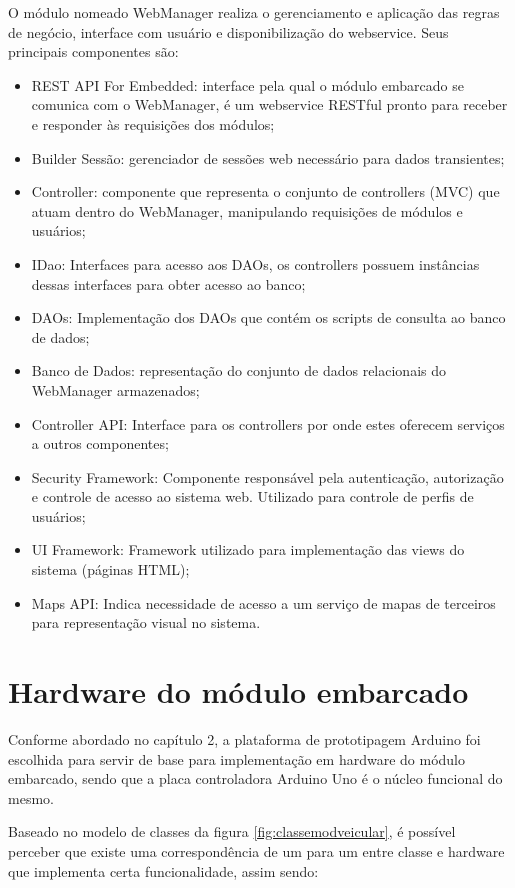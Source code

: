 O módulo nomeado WebManager realiza o gerenciamento e aplicação das regras de negócio, interface com usuário e disponibilização do webservice. Seus principais componentes são:

\begin{itemize}
	\item REST API For Embedded: interface pela qual o módulo embarcado se comunica com o WebManager, é um webservice RESTful pronto para receber e responder às requisições dos módulos;
	\item Builder Sessão: gerenciador de sessões web necessário para dados transientes;
	\item Controller: componente que representa o conjunto de controllers (MVC) que atuam dentro do WebManager, manipulando requisições de módulos e usuários;
	\item IDao: Interfaces para acesso aos DAOs, os controllers possuem instâncias dessas interfaces para obter acesso ao banco;
	\item DAOs: Implementação dos DAOs que contém os scripts de consulta ao banco de dados;
	\item Banco de Dados: representação do conjunto de dados relacionais do WebManager armazenados;
	\item Controller API: Interface para os controllers por onde estes oferecem serviços a outros componentes;
	\item Security Framework: Componente responsável pela autenticação, autorização e controle de acesso ao sistema web. Utilizado para controle de perfis de usuários;
	\item UI Framework: Framework utilizado para implementação das views do sistema (páginas HTML);
	\item Maps API: Indica necessidade de acesso a um serviço de mapas de terceiros para representação visual no sistema.
\end{itemize}

\section{Hardware do módulo embarcado}

Conforme abordado no capítulo 2, a plataforma de prototipagem Arduino foi escolhida para servir de base para implementação em hardware do módulo embarcado, sendo que a placa controladora Arduino Uno é o núcleo funcional do mesmo. 

Baseado no modelo de classes da figura \ref{fig:classemodveicular}, é possível perceber que existe uma correspondência de um para um entre classe e hardware que implementa certa funcionalidade, assim sendo:

